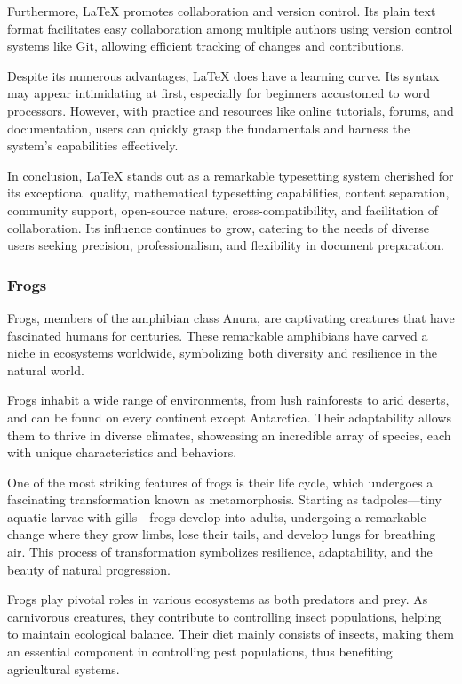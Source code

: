 \documentclass[twocolumn, 9pt]{extarticle}
\begin{document}
Furthermore, LaTeX promotes collaboration and version control. Its plain text format facilitates easy collaboration among multiple authors using version control systems like Git, allowing efficient tracking of changes and contributions.

Despite its numerous advantages, LaTeX does have a learning curve. Its syntax may appear intimidating at first, especially for beginners accustomed to word processors. However, with practice and resources like online tutorials, forums, and documentation, users can quickly grasp the fundamentals and harness the system's capabilities effectively.

In conclusion, LaTeX stands out as a remarkable typesetting system cherished for its exceptional quality, mathematical typesetting capabilities, content separation, community support, open-source nature, cross-compatibility, and facilitation of collaboration. Its influence continues to grow, catering to the needs of diverse users seeking precision, professionalism, and flexibility in document preparation.


\subsubsection{Frogs}

Frogs, members of the amphibian class Anura, are captivating creatures that have fascinated humans for centuries. These remarkable amphibians have carved a niche in ecosystems worldwide, symbolizing both diversity and resilience in the natural world.

Frogs inhabit a wide range of environments, from lush rainforests to arid deserts, and can be found on every continent except Antarctica. Their adaptability allows them to thrive in diverse climates, showcasing an incredible array of species, each with unique characteristics and behaviors.

One of the most striking features of frogs is their life cycle, which undergoes a fascinating transformation known as metamorphosis. Starting as tadpoles—tiny aquatic larvae with gills—frogs develop into adults, undergoing a remarkable change where they grow limbs, lose their tails, and develop lungs for breathing air. This process of transformation symbolizes resilience, adaptability, and the beauty of natural progression.

Frogs play pivotal roles in various ecosystems as both predators and prey. As carnivorous creatures, they contribute to controlling insect populations, helping to maintain ecological balance. Their diet mainly consists of insects, making them an essential component in controlling pest populations, thus benefiting agricultural systems.
\end{document}
